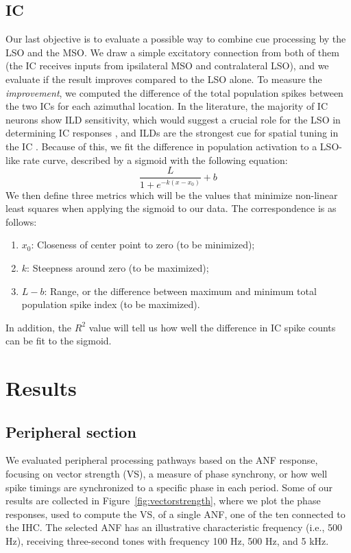 \documentclass[11pt,a4paper,twocolumn]{article}
\begin{document}
\subsection{IC}
Our last objective is to evaluate a possible way to combine cue processing by the LSO and the MSO. We draw a simple excitatory connection from both of them (the IC receives inputs from ipsilateral MSO and contralateral LSO), and we evaluate if the result improves compared to the LSO alone. To measure the \textit{improvement}, we computed the difference of the total population spikes between the two ICs for each azimuthal location. In the literature, the majority of IC neurons show ILD sensitivity, which would suggest a crucial role for the LSO in determining IC responses \cite{grotheMechanismsSoundLocalization2010}, and ILDs are the strongest cue for spatial tuning in the IC \cite{sleeLinearProcessingInteraural2013}. Because of this, we fit the difference in population activation to a LSO-like rate curve, described by a sigmoid with the following equation:
\begin{equation*}
    \frac{L}{1 + e^{-k(x - x_0)}} + b
\end{equation*}
We then define three metrics which will be the values that minimize non-linear least squares when applying the sigmoid to our data. The correspondence is as follows:
\begin{enumerate}
    \item \textit{$x_0$}: Closeness of center point to zero (to be minimized);
    \item \textit{$k$}: Steepness around zero (to be maximized);
    \item \textit{$L - b$}: Range, or the difference between maximum and minimum total population spike index (to be maximized).
\end{enumerate}
In addition, the $R^2$ value will tell us how well the difference in IC spike counts can be fit to the sigmoid.

\section{Results}
\subsection{Peripheral section}
We evaluated peripheral processing pathways based on the ANF response, focusing on vector strength (VS), a measure of phase synchrony, or how well spike timings are synchronized to a specific phase in each period. Some of our results are collected in Figure~\ref{fig:vectorstrength}, where we plot the phase responses, used to compute the VS, of a single ANF, one of the ten connected to the IHC. The selected ANF has an illustrative characteristic frequency (i.e., 500 Hz), receiving three-second tones with frequency 100 Hz, 500 Hz, and 5 kHz.
\end{document}
